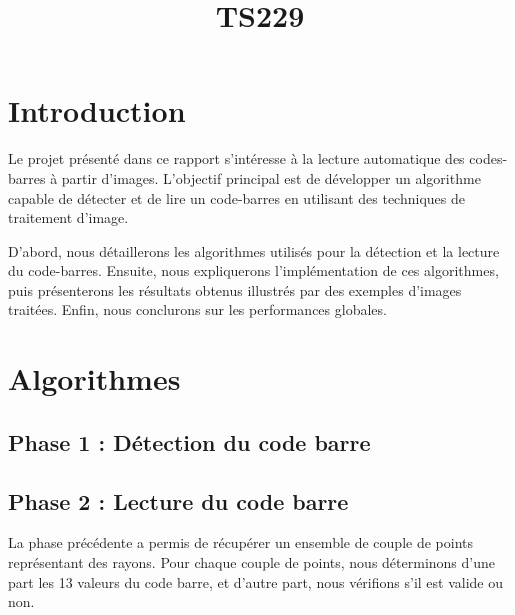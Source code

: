 \documentclass{rapport}
\title{TS229}
\begin{document}

\fairemarges %
\fairepagedegarde %
\newpage
\tabledematieres %
\newpage

\section{Introduction}
Le projet présenté dans ce rapport s'intéresse à la lecture automatique des codes-barres à partir d'images. 
L'objectif principal est de développer un algorithme capable de détecter et de lire un code-barres en utilisant des techniques de traitement d'image.

D'abord, nous détaillerons les algorithmes utilisés pour la détection et la lecture du code-barres. 
Ensuite, nous expliquerons l'implémentation de ces algorithmes, puis présenterons les résultats obtenus illustrés par des exemples d'images traitées. 
Enfin, nous conclurons sur les performances globales.

\section{Algorithmes}

\subsection{Phase 1 : Détection du code barre}
\subsection{Phase 2 : Lecture du code barre}

La phase précédente a permis de récupérer un ensemble de couple de points représentant des rayons. 
Pour chaque couple de points, nous déterminons d'une part les 13 valeurs du code barre, et d'autre part, nous vérifions s'il est valide ou non.
\end{document}
